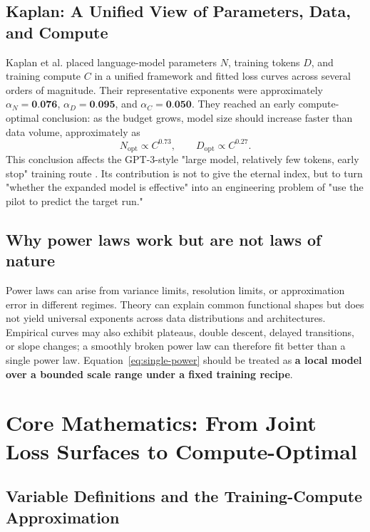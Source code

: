 \documentclass[UTF8,10pt,a4paper,fontset=none]{ctexart}
\newcommand{\term}[1]{\textbf{#1}}
\begin{document}
\subsection{Kaplan: A Unified View of Parameters, Data, and Compute}

Kaplan et al. placed language-model parameters $N$, training tokens $D$, and training compute $C$ in a unified framework and fitted loss curves across several orders of magnitude\cite{kaplan2020}. Their representative exponents were approximately $\alpha_N=\textbf{0.076}$, $\alpha_D=\textbf{0.095}$, and $\alpha_C=\textbf{0.050}$. They reached an early compute-optimal conclusion: as the budget grows, model size should increase faster than data volume, approximately as
\begin{equation}
  N_{\mathrm{opt}}\propto C^{0.73},\qquad
  D_{\mathrm{opt}}\propto C^{0.27}.
  \label{eq:kaplan-opt}
\end{equation}
This conclusion affects the GPT-3-style "large model, relatively few tokens, early stop" training route \cite{brown2020}. Its contribution is not to give the eternal index, but to turn "whether the expanded model is effective" into an engineering problem of "use the pilot to predict the target run."

\subsection{Why power laws work but are not laws of nature}

Power laws can arise from variance limits, resolution limits, or approximation error in different regimes. Theory can explain common functional shapes but does not yield universal exponents across data distributions and architectures\cite{bahri2021}. Empirical curves may also exhibit plateaus, double descent, delayed transitions, or slope changes; a smoothly broken power law can therefore fit better than a single power law\cite{caballero2022}. Equation~\eqref{eq:single-power} should be treated as \term{a local model over a bounded scale range under a fixed training recipe}.

\section{Core Mathematics: From Joint Loss Surfaces to Compute-Optimal}

\subsection{Variable Definitions and the Training-Compute Approximation}
\end{document}
